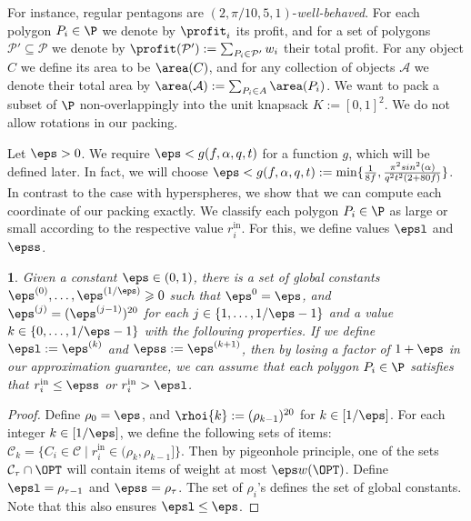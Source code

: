 \documentclass[10pt,a4paper]{article}
\theoremstyle{plain}
\theoremstyle{plain}
\newtheorem{lem}[theorem]{\protect\lemmaname}
\theoremstyle{plain}
\theoremstyle{definition}
\providecommand{\lemmaname}{Lemma}
\begin{document}
{For instance, regular pentagons are $(2,\pi/10,5,1)$-\emph{well-behaved}.
For each polygon \(P_i \in \P\) we denote by \(\profit_i\) its profit, and for a set of polygons
$\mathcal{P}' \subseteq \mathcal{P}$ we denote by $\profit(\mathcal{P}'):=\sum_{P_i \in \mathcal{P'}} w_i$ their total profit.
For any {object} $C$ we define its area to be $\area(C)$, and
for any collection of objects $\mathcal{A}$ we denote their {total} area by $\area(\mathcal{A}):=\sum_{P_i \in A} \area(P_i)$.
{We want to pack a subset of $\P$ non-overlappingly into the
unit knapsack $K := [0,1]^2$. We do not allow rotations in our packing.
}

Let $\eps>0$. We require $\eps < g(f,\alpha,q,t)$ for a function $g$, which will be defined later.
In fact, we will choose $\eps < g(f,\alpha,q,t) := \min \{\frac{1}{8f}, \frac{\pi^2 sin^2(\alpha)}{q^2t^2(2+80f)}\}$.
 In contrast to
the case with hyperspheres, we show that we can compute each coordinate of our
packing exactly. We classify each polygon $P_{i}\in\P$ as large or small according
to the respective value $r_{i}^{\mathrm{in}}$.
For this, we define values $\epsl$ and $\epss$. 


\begin{lem}\label{lem:create-gap-polygons}
Given a constant $\eps\in(0,1)$, there is a
	set of global constants $\eps^{(0)},\ldots,\eps^{(1/\eps)}\geqslant 0$ such that
	$\eps^{0}=\eps$, and $\eps^{(j)}=(\eps^{(j-1)})^{20}$ for each $j\in\{1,\ldots,{1/\eps}-1\}$
	and a value $k\in\{0,\ldots,{1/\eps}-1\}$ with the following properties. If we define
	$\epsl:=\eps^{(k)}$ and $\epss:=\eps^{(k+1)}$, then by
	losing a factor of
 $1+\eps$ in our approximation
	guarantee, we can assume that each polygon $P_{i}\in\P$ satisfies
	that $r_{i}^{\mathrm{in}} \le \epss$ or $r_{i}^{\mathrm{in}} > \epsl$.

	\end{lem}
\begin{proof}
Define $\rho_0=\eps$, and $\rhoi{k} := (\rho_{k-1})^{20}$ for $k \in [1/\eps]$. For each integer $k \in [1/\eps]$,  we define the following sets of items:
$\mathcal{C}_k = \{C_i \in \mathcal{C} \mid r_{i}^{\mathrm{in}}  \in (\rho_{k},\rho_{k-1}]\}$.
Then by pigeonhole principle, one of the sets $\mathcal{C}_{\tau} \cap \OPT$ will contain items of weight at most $\eps w(\OPT)$.
Define $\epsl=\rho_{\tau-1}$ and $\epss=\rho_{\tau}$. The set of $\rho_i$'s defines the set of global constants. Note that this also ensures $\epsl\le \eps$.
\end{proof}


}
\end{document}
